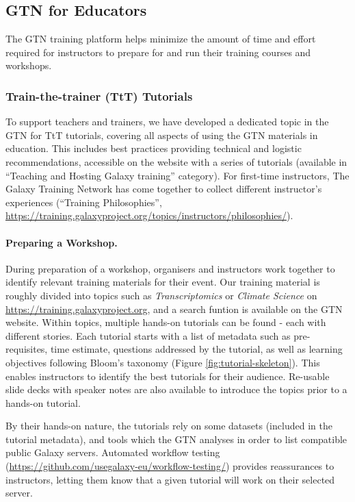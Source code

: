 \documentclass[10pt,letterpaper]{article}
\begin{document}
\subsection*{GTN for Educators}
The GTN training platform helps minimize the amount of time and effort required for instructors to prepare for and run their training courses and workshops. 

\subsubsection*{Train-the-trainer (TtT) Tutorials}
To support teachers and trainers, we have developed a dedicated topic in the GTN for TtT tutorials, covering all aspects of using the GTN materials in education. This includes best practices providing technical and logistic recommendations, accessible on the website with a series of tutorials (available in ``Teaching and Hosting Galaxy training'' category). For first-time instructors, The Galaxy Training Network has come together to collect different instructor’s experiences (``Training Philosophies'', \url{https://training.galaxyproject.org/topics/instructors/philosophies/}).

\paragraph{Preparing a Workshop.} During preparation of a workshop, organisers and instructors work together to identify relevant training materials for their event. Our training material is roughly divided into topics such as \emph{Transcriptomics} or \emph{Climate Science} on \url{https://training.galaxyproject.org}, and a search funtion is available on the GTN website. Within topics, multiple hands-on tutorials can be found - each with different stories. Each tutorial starts with a list of metadata such as pre-requisites, time estimate, questions addressed by the tutorial, as well as learning objectives following Bloom’s taxonomy \cite{Bloom1956} (Figure \ref{fig:tutorial-skeleton}). This enables instructors to identify the best tutorials for their audience. Re-usable slide decks with speaker notes are also available to introduce the topics prior to a hands-on tutorial. 

By their hands-on nature, the tutorials rely on some datasets (included in the tutorial metadata), and tools which the GTN analyses in order to list compatible public Galaxy servers. Automated workflow testing (\url{https://github.com/usegalaxy-eu/workflow-testing/}) provides reassurances to instructors, letting them know that a given tutorial will work on their selected server.
\end{document}

